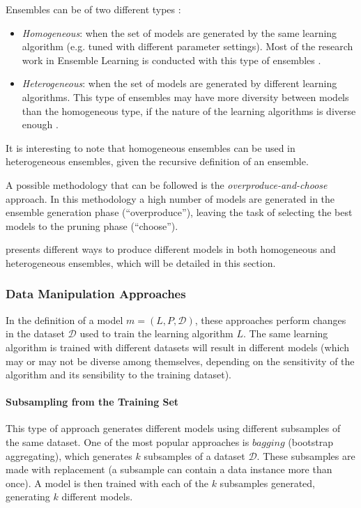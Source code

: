 Ensembles can be of two different types \cite{Mendes-Moreira2012}:

\begin{itemize}
	\item \textit{Homogeneous}: when the set of models are generated by the same learning algorithm (e.g. tuned with different parameter settings). Most of the research work in Ensemble Learning is conducted with this type of ensembles \cite{Mendes-Moreira2012}.
	\item \textit{Heterogeneous}: when the set of models are generated by different learning algorithms. This type of ensembles may have more diversity between models than the homogeneous type, if the nature of the learning algorithms is diverse enough \cite{Mendes-Moreira2012}.
\end{itemize}

It is interesting to note that homogeneous ensembles can be used in heterogeneous ensembles, given the recursive definition of an ensemble.

A possible methodology that can be followed is the \textit{overproduce-and-choose} approach.
In this methodology a high number of models are generated in the ensemble generation phase (``overproduce''), leaving the task of selecting the best models to the pruning phase (``choose'').	

\textcite{Mendes-Moreira2012} presents different ways to produce different models in both homogeneous and heterogeneous ensembles, which will be detailed in this section.

\subsubsection{Data Manipulation Approaches}\label{sec:data_manipulation}

In the definition of a model $m = (L, P, \mathcal{D})$, these approaches perform changes in the dataset $\mathcal{D}$ used to train the learning algorithm $L$. The same learning algorithm is trained with different datasets will result in different models (which may or may not be diverse among themselves, depending on the sensitivity of the algorithm and its sensibility to the training dataset).

\paragraph{Subsampling from the Training Set}\mbox{}

This type of approach generates different models using different subsamples of the same dataset.
One of the most popular approaches is $bagging$ (bootstrap aggregating), which generates $k$ subsamples of a dataset $\mathcal{D}$.
These subsamples are made with replacement (a subsample can contain a data instance more than once).
A model is then trained with each of the $k$ subsamples generated, generating $k$ different models.

